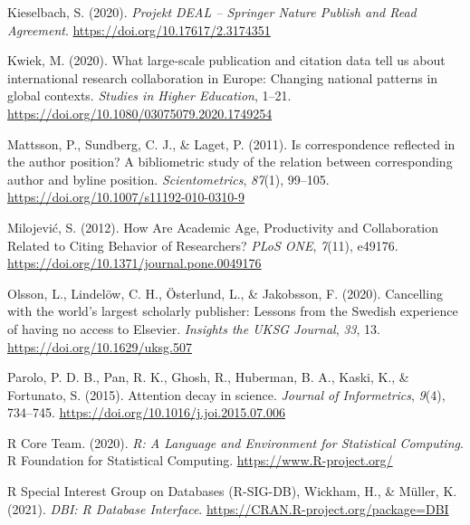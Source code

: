 \documentclass[
]{article}
\newlength{\cslhangindent}
\newlength{\cslentryspacingunit} %
\newenvironment{CSLReferences}[2] %
 {%
  \setlength{\parindent}{0pt}
  \ifodd #1
  \let\oldpar\par
  \def\par{\hangindent=\cslhangindent\oldpar}
  \fi
  \setlength{\parskip}{#2\cslentryspacingunit}
 }%
 {}
\begin{document}
\begin{CSLReferences}{1}{0}
\leavevmode{}%
Kieselbach, S. (2020). \emph{Projekt {DEAL} -- {Springer} {Nature} {Publish} and {Read} {Agreement}}. \url{https://doi.org/10.17617/2.3174351}

\leavevmode{}%
Kwiek, M. (2020). What large-scale publication and citation data tell us about international research collaboration in {Europe}: Changing national patterns in global contexts. \emph{Studies in Higher Education}, 1--21. \url{https://doi.org/10.1080/03075079.2020.1749254}

\leavevmode{}%
Mattsson, P., Sundberg, C. J., \& Laget, P. (2011). Is correspondence reflected in the author position? {A} bibliometric study of the relation between corresponding author and byline position. \emph{Scientometrics}, \emph{87}(1), 99--105. \url{https://doi.org/10.1007/s11192-010-0310-9}

\leavevmode{}%
Milojević, S. (2012). How {Are} {Academic} {Age}, {Productivity} and {Collaboration} {Related} to {Citing} {Behavior} of {Researchers}? \emph{PLoS ONE}, \emph{7}(11), e49176. \url{https://doi.org/10.1371/journal.pone.0049176}

\leavevmode{}%
Olsson, L., Lindelöw, C. H., Österlund, L., \& Jakobsson, F. (2020). Cancelling with the world's largest scholarly publisher: Lessons from the {Swedish} experience of having no access to {Elsevier}. \emph{Insights the UKSG Journal}, \emph{33}, 13. \url{https://doi.org/10.1629/uksg.507}

\leavevmode{}%
Parolo, P. D. B., Pan, R. K., Ghosh, R., Huberman, B. A., Kaski, K., \& Fortunato, S. (2015). Attention decay in science. \emph{Journal of Informetrics}, \emph{9}(4), 734--745. \url{https://doi.org/10.1016/j.joi.2015.07.006}

\leavevmode{}%
R Core Team. (2020). \emph{R: {A} {Language} and {Environment} for {Statistical} {Computing}}. R Foundation for Statistical Computing. \url{https://www.R-project.org/}

\leavevmode{}%
R Special Interest Group on Databases (R-SIG-DB), Wickham, H., \& Müller, K. (2021). \emph{{DBI}: {R} {Database} {Interface}}. \url{https://CRAN.R-project.org/package=DBI}


\end{CSLReferences}
\end{document}
